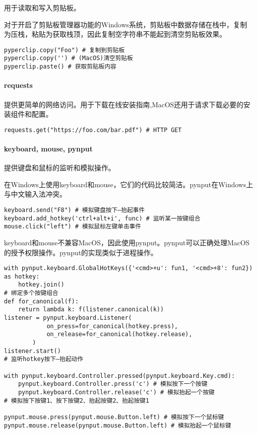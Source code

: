 \documentclass[AutoFakeBold,letterpaper,12pt,hidelinks]{article}
\begin{document}
用于读取和写入剪贴板。

对于开启了剪贴板管理器功能的Windows系统，剪贴板中数据存储在栈中，复制为压栈，粘贴为获取栈顶，因此复制空字符串不能起到清空剪贴板效果。

\begin{verbatim}
pyperclip.copy("Foo") # 复制到剪贴板
pyperclip.copy('') # (MacOS)清空剪贴板
pyperclip.paste() # 获取剪贴板内容
\end{verbatim}

\paragraph{requests}

提供更简单的网络访问。用于下载在线安装指南,MacOS还用于请求下载必要的安装组件和配置。

\begin{verbatim}
requests.get("https://foo.com/bar.pdf") # HTTP GET
\end{verbatim}

\paragraph{keyboard, mouse, pynput}

提供键盘和鼠标的监听和模拟操作。

在Windows上使用keyboard和mouse，它们的代码比较简洁。pynput在Windows上与中文输入法冲突。

\begin{verbatim}
keyboard.send("F8") # 模拟键盘按下—抬起事件
keyboard.add_hotkey('ctrl+alt+i', func) # 监听某一按键组合
mouse.click("left") # 模拟鼠标左键单击事件
\end{verbatim}

keyboard和mouse不兼容MacOS，因此使用pynput。pynput可以正确处理MacOS的授予权限操作。pynput的实现类似于进程操作。

\begin{verbatim}
with pynput.keyboard.GlobalHotKeys({'<cmd>+u': fun1, '<cmd>+8': fun2}) as hotkey:
    hotkey.join()
# 绑定多个按键组合
def for_canonical(f):
    return lambda k: f(listener.canonical(k))
listener = pynput.keyboard.Listener(
            on_press=for_canonical(hotkey.press),
            on_release=for_canonical(hotkey.release),
        )
listener.start()
# 监听hotkey按下—抬起动作

with pynput.keyboard.Controller.pressed(pynput.keyboard.Key.cmd):
    pynput.keyboard.Controller.press('c') # 模拟按下一个按键
    pynput.keyboard.Controller.release('c') # 模拟抬起一个按键
# 模拟按下按键1、按下按键2、抬起按键2、抬起按键1

pynput.mouse.press(pynput.mouse.Button.left) # 模拟按下一个鼠标键
pynput.mouse.release(pynput.mouse.Button.left) # 模拟抬起一个鼠标键
\end{verbatim}
\end{document}
